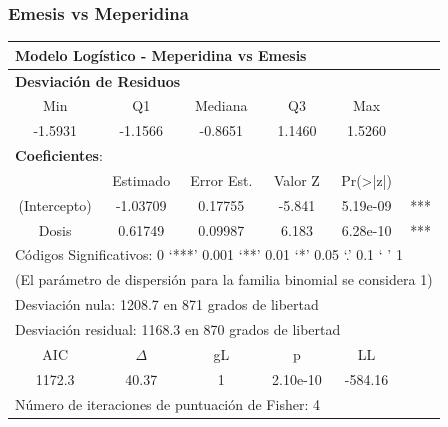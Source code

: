 \documentclass[10pt]{beamer}
\begin{document}
	\begin{frame}
	\frametitle{Emesis vs Meperidina}
	
	\begin{table}[]
		\centering
		\small
		\begin{tabular}{|c|c|c|c|c|c|}
			\hline
			\multicolumn{6}{|l|}{\textbf{Modelo Logístico - Meperidina vs Emesis}}                         \\ \hline
			\multicolumn{6}{|l|}{\textbf{{Desviación de Residuos}}}                                        \\ \hline
			    Min      &    Q1    &  Mediana   &    Q3    &          Max          &                      \\ \hline
			  -1.5931    & -1.1566  &  -0.8651   &  1.1460  &        1.5260         &                      \\ \hline
			\multicolumn{6}{|l|}{\textbf{Coeficientes}:}                                                   \\ \hline
			             & Estimado & Error Est. & Valor Z  & Pr(\textgreater{}|z|) &                      \\ \hline
			(Intercepto) & -1.03709 &  0.17755   &  -5.841  &       5.19e-09        &         ***          \\ \hline
			   Dosis     & 0.61749  &  0.09987   &  6.183   &       6.28e-10        &         ***          \\ \hline
			\multicolumn{6}{|l|}{Códigos Significativos:  0 ‘***’ 0.001 ‘**’ 0.01 ‘*’  0.05 ‘.’ 0.1 ‘ ’ 1} \\ \hline
			\multicolumn{6}{|l|}{(El parámetro de dispersión para la familia binomial se considera 1)}     \\ \hline
			\multicolumn{6}{|l|}{Desviación nula: 1208.7 en 871 grados de libertad}                        \\ \hline
			\multicolumn{6}{|l|}{Desviación residual: 1168.3 en 870 grados de libertad}                    \\ \hline
			    AIC      & $\Delta$ &     gL     &    p     &          LL           &                      \\ \hline
			   1172.3    &  40.37   &     1      & 2.10e-10 &        -584.16        &                      \\ \hline
			\multicolumn{6}{|l|}{Número de iteraciones de puntuación de Fisher: 4}                         \\ \hline
		\end{tabular}
	\end{table}
\end{frame}
\end{document}
